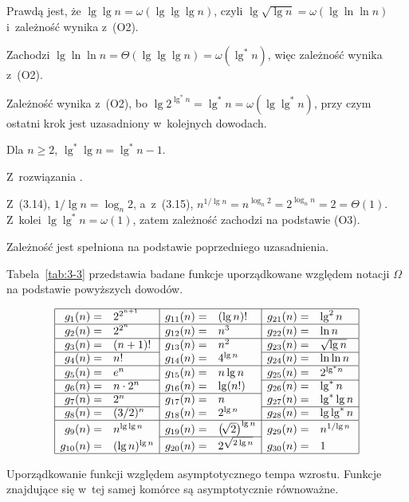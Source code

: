 \begin{description}[font=\textnormal, topsep=2ex, itemsep=2ex]
\[	\]
	Prawdą jest, że $\lg\lg n=\omega(\lg\lg\lg n)$, czyli $\lg\sqrt{\lg n}=\omega(\lg\ln\ln n)$ i~zależność wynika z~(O2).
	\item[$\ln\ln n=\omega\bigl(2^{\lg^*\!n}\bigr)$:]
	Zachodzi $\lg\ln\ln n=\Theta(\lg\lg\lg n)=\omega(\lg^*n)$, więc zależność wynika z~(O2).
	\item[$2^{\lg^*\!n}=\omega(\lg^*n)$:]
	Zależność wynika z~(O2), bo $\lg2^{\lg^*\!n}=\lg^*n=\omega(\lg\lg^*n)$, przy czym ostatni krok jest uzasadniony w~kolejnych dowodach.
	\item[$\lg^*n=\Theta(\lg^*\lg n)$:]
	Dla $n\ge2$, $\lg^*\lg n=\lg^*n-1$.
	\item[$\lg^*\lg n=\omega(\lg\lg^*n)$:]
	Z~rozwiązania .
	\item[$\lg\lg^*n=\omega\bigl(n^{1/\!\lg n}\bigr)$:]
	Z~(3.14), $1/\!\lg n=\log_n2$, a~z~(3.15), $n^{1/\!\lg n}=n^{\log_n2}=2^{\log_nn}=2=\Theta(1)$.
	Z~kolei $\lg\lg^*n=\omega(1)$, zatem zależność zachodzi na podstawie (O3).
	\item[$n^{1/\!\lg n}=\Theta(1)$:]
	Zależność jest spełniona na podstawie poprzedniego uzasadnienia.
\end{description}

Tabela~\ref{tab:3-3} przedstawia badane funkcje uporządkowane względem notacji $\Omega$ na podstawie powyższych dowodów.
\begin{table}[!ht]
	\renewcommand*{\arraystretch}{1.4}
	\centering
	\[
		\begin{array}{|rl|rl|rl|} \hline
		g_1(n)= & 2^{2^{n+1}} & g_{11}(n)= & (\lg n)! & g_{21}(n)= & \lg^2n \\ \hline
		g_2(n)= & 2^{2^n} & g_{12}(n)= & n^3 & g_{22}(n)= & \ln n \\ \hline
		g_3(n)= & (n+1)! & g_{13}(n)= & n^2 & g_{23}(n)= & \sqrt{\lg n} \\ \cline{1-2}\cline{5-6}
		g_4(n)= & n! & g_{14}(n)= & 4^{\lg n} & g_{24}(n)= & \ln\ln n \\ \hline
		g_5(n)= & e^n & g_{15}(n)= & n\lg n & g_{25}(n)= & 2^{\lg^*\!n} \\ \cline{1-2}\cline{5-6}
		g_6(n)= & n\cdot2^n & g_{16}(n)= & \lg(n!) & g_{26}(n)= & \lg^*n \\ \cline{1-4}
		g_7(n)= & 2^n & g_{17}(n)= & n & g_{27}(n)= & \lg^*\lg n \\ \cline{1-2}\cline{5-6}
		g_8(n)= & (3/2)^n & g_{18}(n)= & 2^{\lg n} & g_{28}(n)= & \lg\lg^*n \\ \hline
		g_9(n)= & n^{\lg\lg n} & g_{19}(n)= & \bigl(\!\sqrt{2}\bigr)^{\lg n} & g_{29}(n)= & n^{1/\!\lg n} \\ \cline{3-4}
		g_{10}(n)= & (\lg n)^{\lg n} & g_{20}(n)= & 2^{\sqrt{2\lg n}} & g_{30}(n)= & 1 \\ \hline
		\end{array}
	\]
	\caption{Uporządkowanie funkcji względem asymptotycznego tempa wzrostu.
	Funkcje znajdujące się w~tej samej komórce są asymptotycznie równoważne.} \label{tab:3-3}
\end{table}

